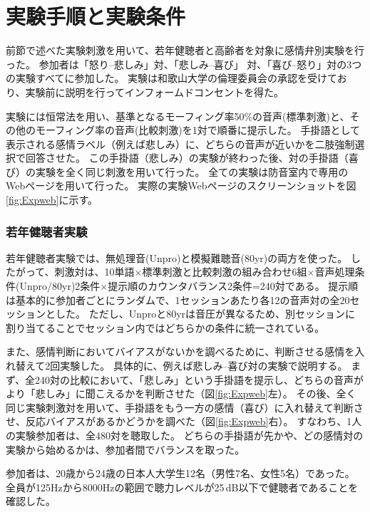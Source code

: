 \newpage
\section{実験手順と実験条件}
\label{sec:ExpCondition}
前節で述べた実験刺激を用いて、若年健聴者と高齢者を対象に感情弁別実験を行った。
参加者は「怒り--悲しみ」対、「悲しみ--喜び」 対、「喜び--怒り」対の3つの実験すべてに参加した。
実験は和歌山大学の倫理委員会の承認を受けており、実験前に説明を行ってインフォームドコンセントを得た。

実験には恒常法を用い、基準となるモーフィング率50\%の音声(標準刺激)と、その他のモーフィング率の音声(比較刺激)を1対で順番に提示した。
手掛語として表示される感情ラベル（例えば悲しみ）に、どちらの音声が近いかを二肢強制選択で回答させた。
この手掛語（悲しみ）の実験が終わった後、対の手掛語（喜び）の実験を全く同じ刺激を用いて行った。
全ての実験は防音室内で専用のWebページ\cite{AMLAB_WebOpen}を用いて行った。
実際の実験Webページのスクリーンショットを図\ref{fig:Expweb}に示す。


\subsubsection{若年健聴者実験}

若年健聴者実験では、無処理音(Unpro)と模擬難聴音(80yr)の両方を使った。
したがって、刺激対は、10単語$\times$標準刺激と比較刺激の組み合わせ6組$\times$音声処理条件(Unpro/80yr)2条件$\times$提示順のカウンタバランス2条件=240対である。
提示順は基本的に参加者ごとにランダムで、1セッションあたり各12の音声対の全20セッションとした。
ただし、Unproと80yrは音圧が異なるため、別セッションに割り当てることでセッション内ではどちらかの条件に統一されている。

また、感情判断においてバイアスがないかを調べるために、判断させる感情を入れ替えて2回実験した。
具体的に、例えば悲しみ--喜び対の実験で説明する。
まず、全240対の比較において、「悲しみ」という手掛語を提示し、どちらの音声がより「悲しみ」に聞こえるかを判断させた（図\ref{fig:Expweb}左）。
その後、全く同じ実験刺激対を用いて、手掛語をもう一方の感情（喜び）に入れ替えて判断させ、反応バイアスがあるかどうかを調べた（図\ref{fig:Expweb}右）。
すなわち、1人の実験参加者は、全480対を聴取した。
どちらの手掛語が先かや、どの感情対の実験から始めるかは、参加者間でバランスを取った。

参加者は、20歳から24歳の日本人大学生12名（男性7名、女性5名）であった。
全員が125Hzから8000Hzの範囲で聴力レベルが25\,dB以下で健聴者であることを確認した。


